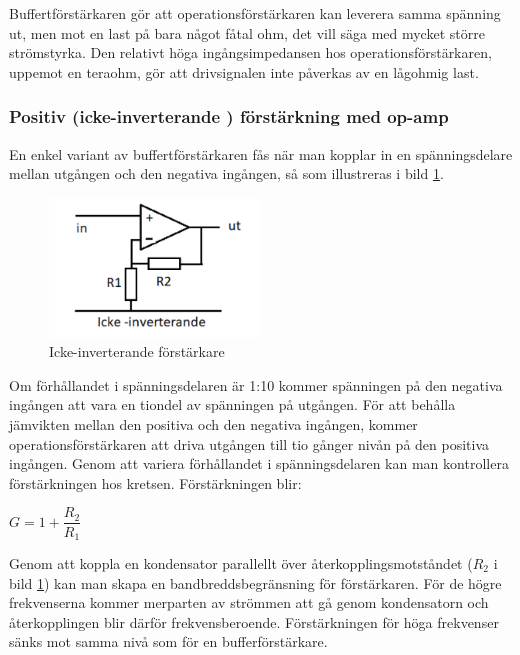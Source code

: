 Buffertförstärkaren gör att operationsförstärkaren kan leverera samma spänning ut, men mot en
last på bara något fåtal ohm, det vill säga med mycket större strömstyrka.
Den relativt höga ingångsimpedansen hos operationsförstärkaren, uppemot en teraohm, gör att drivsignalen inte påverkas av en lågohmig last.

\subsubsection{Positiv (icke-inverterande ) förstärkning med op-amp}
\label{icke-inverterande förstärkning}

En enkel variant av buffertförstärkaren fås när man kopplar in en spänningsdelare
mellan utgången och den negativa ingången, så som illustreras i bild
\ref{fig:BildII2-46}.

\begin{figure}
	\includegraphics[width=0.5\textwidth]{images/cropped_pdfs/bild_2_2-46.pdf}
	\caption{Icke-inverterande förstärkare}
	\label{fig:BildII2-46}
\end{figure}

Om förhållandet i spänningsdelaren är 1:10 kommer spänningen på den negativa ingången att vara en tiondel av spänningen på utgången. För att behålla jämvikten mellan den positiva och den negativa ingången, kommer operationsförstärkaren att driva utgången till tio gånger nivån på den positiva ingången.
Genom att variera förhållandet i spänningsdelaren kan man kontrollera förstärkningen hos kretsen.
Förstärkningen blir:

\(G = 1+ \dfrac{R_2}{R_1}\)

Genom att koppla en kondensator parallellt över återkopplingsmotståndet (\(R_2\) i bild \ref{fig:BildII2-46}) kan man skapa en bandbreddsbegränsning för förstärkaren.
För de högre frekvenserna kommer merparten av strömmen att gå genom kondensatorn och återkopplingen blir därför frekvensberoende.
Förstärkningen för höga frekvenser sänks mot samma nivå som för en bufferförstärkare.

